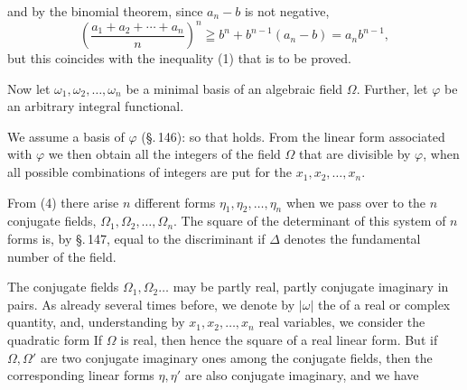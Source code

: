 
and by the binomial theorem, since $a_n - b$ is not negative,
\[ \left(\frac{a_1 + a_2 + \cdots + a_n}{n}\right)^n \geqq b^n + b^{n-1}(a_n - b) = a_n b^{n-1}, \]
but this coincides with the inequality (1) that is to be proved.

Now let $\omega_1, \omega_2, \ldots, \omega_n$ be a minimal basis of an algebraic
field $\Omega$. Further, let $\varphi$ be an arbitrary integral
functional.

We assume a basis of $\varphi$ (\S.\,146):
so that
holds. From the linear form associated with $\varphi$
we then obtain all the integers of the field $\Omega$ that are
divisible by $\varphi$, when all possible combinations of integers
are put for the $x_1, x_2, \ldots, x_n$.

From (4) there arise $n$ different forms $\eta_1, \eta_2, \ldots, \eta_n$
when we pass over to the $n$ conjugate fields, $\Omega_1, \Omega_2, \ldots, \Omega_n$.
The square of the determinant of this system of
$n$ forms is, by \S.\,147, equal to the discriminant
if $\Delta$ denotes the fundamental number of the field.

The conjugate fields $\Omega_1, \Omega_2 \ldots$ may be partly real, partly
conjugate imaginary in pairs. As already several times before, we
denote by $|\omega|$ the  of a real
or complex quantity, and, understanding by
$x_1, x_2, \ldots, x_n$ real variables, we consider the quadratic form
If $\Omega$ is real, then
hence the square of a real linear form. But if $\Omega, \Omega'$
are two conjugate imaginary ones among the conjugate fields, then
the corresponding linear forms $\eta, \eta'$ are also conjugate
imaginary, and we have
